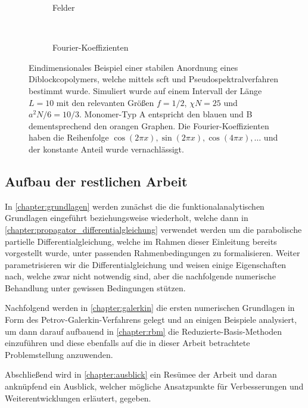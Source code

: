 \begin{figure}[tb]
    \centering
    \begin{subfigure}[b]{0.475\textwidth}
        \centering
        
        \caption{Felder}
    \end{subfigure}
    ~
    \begin{subfigure}[b]{0.475\textwidth}
        \centering
        
        \caption{Fourier-Koeffizienten}
    \end{subfigure}
    \caption[%
    Eindimensionales Beispiel einer stabilen Anordnung eines Diblockcopolymers
    ]{%
        Eindimensionales Beispiel einer stabilen Anordnung eines Diblockcopolymers, welche mittels \ac{scft} und Pseudospektralverfahren bestimmt wurde.
        Simuliert wurde auf einem Intervall der Länge $L = 10$ mit den relevanten Größen $f = 1/2$, $\chi N = 25$ und $a^{2} N / 6 = 10 / 3$.
        Monomer-Typ A entspricht den blauen und B dementsprechend den orangen Graphen.
        Die Fourier-Koeffizienten haben die Reihenfolge $\cos(2 \pi x), \sin(2 \pi x), \cos(4 \pi x), \dots$ und der konstante Anteil wurde vernachlässigt.
    }
    \label{figure:felder_nach_iterationsverfahren}
\end{figure}



\subsection*{Aufbau der restlichen Arbeit}

In \cref{chapter:grundlagen} werden zunächst die die funktionalanalytischen Grundlagen eingeführt beziehungsweise wiederholt, welche dann in \cref{chapter:propagator_differentialgleichung} verwendet werden um die parabolische partielle Differentialgleichung, welche im Rahmen dieser Einleitung bereits vorgestellt wurde, unter passenden Rahmenbedingungen zu formalisieren.
Weiter parametrisieren wir die Differentialgleichung und weisen einige Eigenschaften nach, welche zwar nicht notwendig sind, aber die nachfolgende numerische Behandlung unter gewissen Bedingungen stützen.

Nachfolgend werden in \cref{chapter:galerkin} die ersten numerischen Grundlagen in Form des Petrov-Galerkin-Verfahrens gelegt und an einigen Beispiele analysiert, um dann darauf aufbauend in \cref{chapter:rbm} die Reduzierte-Basis-Methoden einzuführen und diese ebenfalls auf die in dieser Arbeit betrachtete Problemstellung anzuwenden.

Abschließend wird in \cref{chapter:ausblick} ein Resümee der Arbeit und daran anknüpfend ein Ausblick, welcher mögliche Ansatzpunkte für Verbesserungen und Weiterentwicklungen erläutert, gegeben.


